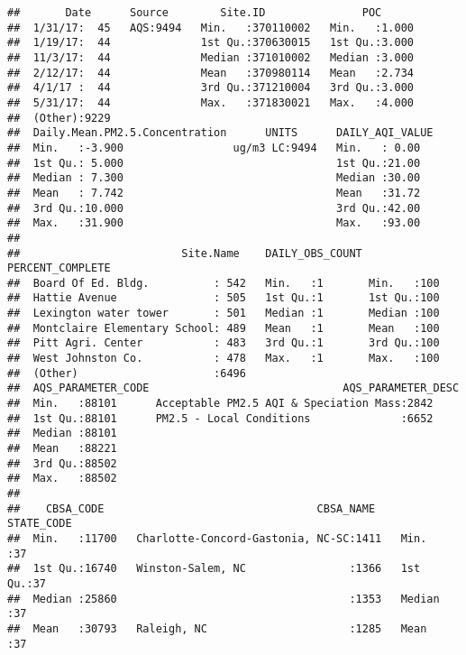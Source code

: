 \documentclass[]{article}
\begin{document}
\begin{verbatim}
##       Date      Source        Site.ID               POC       
##  1/31/17:  45   AQS:9494   Min.   :370110002   Min.   :1.000  
##  1/19/17:  44              1st Qu.:370630015   1st Qu.:3.000  
##  11/3/17:  44              Median :371010002   Median :3.000  
##  2/12/17:  44              Mean   :370980114   Mean   :2.734  
##  4/1/17 :  44              3rd Qu.:371210004   3rd Qu.:3.000  
##  5/31/17:  44              Max.   :371830021   Max.   :4.000  
##  (Other):9229                                                 
##  Daily.Mean.PM2.5.Concentration      UNITS      DAILY_AQI_VALUE
##  Min.   :-3.900                 ug/m3 LC:9494   Min.   : 0.00  
##  1st Qu.: 5.000                                 1st Qu.:21.00  
##  Median : 7.300                                 Median :30.00  
##  Mean   : 7.742                                 Mean   :31.72  
##  3rd Qu.:10.000                                 3rd Qu.:42.00  
##  Max.   :31.900                                 Max.   :93.00  
##                                                                
##                         Site.Name    DAILY_OBS_COUNT PERCENT_COMPLETE
##  Board Of Ed. Bldg.          : 542   Min.   :1       Min.   :100     
##  Hattie Avenue               : 505   1st Qu.:1       1st Qu.:100     
##  Lexington water tower       : 501   Median :1       Median :100     
##  Montclaire Elementary School: 489   Mean   :1       Mean   :100     
##  Pitt Agri. Center           : 483   3rd Qu.:1       3rd Qu.:100     
##  West Johnston Co.           : 478   Max.   :1       Max.   :100     
##  (Other)                     :6496                                   
##  AQS_PARAMETER_CODE                              AQS_PARAMETER_DESC
##  Min.   :88101      Acceptable PM2.5 AQI & Speciation Mass:2842    
##  1st Qu.:88101      PM2.5 - Local Conditions              :6652    
##  Median :88101                                                     
##  Mean   :88221                                                     
##  3rd Qu.:88502                                                     
##  Max.   :88502                                                     
##                                                                    
##    CBSA_CODE                                 CBSA_NAME      STATE_CODE
##  Min.   :11700   Charlotte-Concord-Gastonia, NC-SC:1411   Min.   :37  
##  1st Qu.:16740   Winston-Salem, NC                :1366   1st Qu.:37  
##  Median :25860                                    :1353   Median :37  
##  Mean   :30793   Raleigh, NC                      :1285   Mean   :37  

\end{verbatim}
\end{document}
